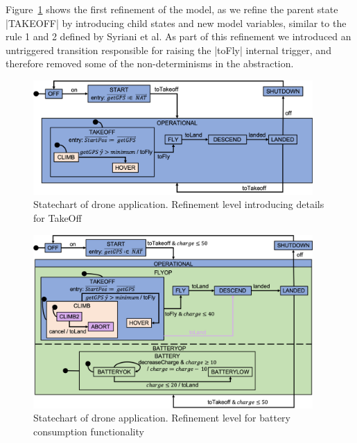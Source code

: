 Figure~\ref{fig:drone2} shows the first refinement of the model, as we refine the parent state |TAKEOFF|
by introducing child states and new model variables, similar to the rule 1 and 2 defined by Syriani et al.
As part of this refinement we introduced an untriggered transition responsible for 
raising the |toFly| internal trigger, and therefore removed some of the non-determinisms in the abstraction.

\begin{figure}[!h]
	\centering
	\includegraphics[width=0.95\textwidth]{figures/Picture2.png}
	\caption{Statechart of drone application. Refinement level introducing details for TakeOff}
	\label{fig:drone2}
\end{figure} 

\begin{figure}[!h]
	\centering
	\includegraphics[width=0.95\textwidth]{figures/Picture5.png}
	\caption{Statechart of drone application. Refinement level for battery consumption functionality}
	\label{fig:drone4}
\end{figure} 

